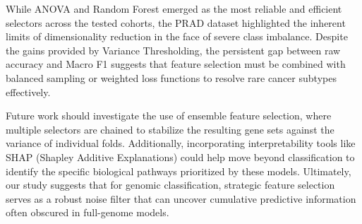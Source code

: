 \documentclass{article}
\begin{document}
While ANOVA and Random Forest emerged as the most reliable and efficient selectors across the tested cohorts, the PRAD dataset highlighted the inherent limits of dimensionality reduction in the face of severe class imbalance. Despite the gains provided by Variance Thresholding, the persistent gap between raw accuracy and Macro F1 suggests that feature selection must be combined with balanced sampling or weighted loss functions to resolve rare cancer subtypes effectively.

Future work should investigate the use of ensemble feature selection, where multiple selectors are chained to stabilize the resulting gene sets against the variance of individual folds. Additionally, incorporating interpretability tools like SHAP (Shapley Additive Explanations) could help move beyond classification to identify the specific biological pathways prioritized by these models. Ultimately, our study suggests that for genomic classification, strategic feature selection serves as a robust noise filter that can uncover cumulative predictive information often obscured in full-genome models.
\end{document}
